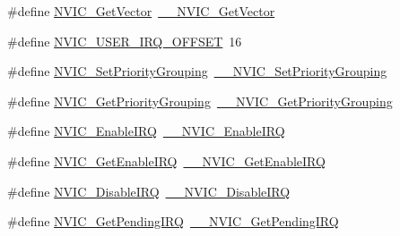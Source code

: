\begin{DoxyCompactItemize}
\item 
\#define \mbox{\hyperlink{group___c_m_s_i_s___core___n_v_i_c_functions_ga955eb1c33a3dcc62af11a8385e8c0fc8}{N\+V\+I\+C\+\_\+\+Get\+Vector}}~\mbox{\hyperlink{group___c_m_s_i_s___core___n_v_i_c_functions_ga44b665d2afb708121d9b10c76ff00ee5}{\+\_\+\+\_\+\+N\+V\+I\+C\+\_\+\+Get\+Vector}}
\item 
\#define \mbox{\hyperlink{group___c_m_s_i_s___core___n_v_i_c_functions_ga8045d905a5ca57437d8e6f71ffcb6df5}{N\+V\+I\+C\+\_\+\+U\+S\+E\+R\+\_\+\+I\+R\+Q\+\_\+\+O\+F\+F\+S\+ET}}~16
\item 
\#define \mbox{\hyperlink{group___c_m_s_i_s___core___n_v_i_c_functions_ga0e798d5aec68cdd8263db86a76df788f}{N\+V\+I\+C\+\_\+\+Set\+Priority\+Grouping}}~\mbox{\hyperlink{group___c_m_s_i_s___core___n_v_i_c_functions_gafc94dcbaee03e4746ade1f5bb9aaa56d}{\+\_\+\+\_\+\+N\+V\+I\+C\+\_\+\+Set\+Priority\+Grouping}}
\item 
\#define \mbox{\hyperlink{group___c_m_s_i_s___core___n_v_i_c_functions_ga4eeb9214f2264fc23c34ad5de2d3fa11}{N\+V\+I\+C\+\_\+\+Get\+Priority\+Grouping}}~\mbox{\hyperlink{group___c_m_s_i_s___core___n_v_i_c_functions_ga9b894af672df4373eb637f8288845c05}{\+\_\+\+\_\+\+N\+V\+I\+C\+\_\+\+Get\+Priority\+Grouping}}
\item 
\#define \mbox{\hyperlink{group___c_m_s_i_s___core___n_v_i_c_functions_ga57b3064413dbc7459d9646020fdd8bef}{N\+V\+I\+C\+\_\+\+Enable\+I\+RQ}}~\mbox{\hyperlink{group___c_m_s_i_s___core___n_v_i_c_functions_ga71227e1376cde11eda03fcb62f1b33ea}{\+\_\+\+\_\+\+N\+V\+I\+C\+\_\+\+Enable\+I\+RQ}}
\item 
\#define \mbox{\hyperlink{group___c_m_s_i_s___core___n_v_i_c_functions_ga857de13232ec65dd15087eaa15bc4a69}{N\+V\+I\+C\+\_\+\+Get\+Enable\+I\+RQ}}~\mbox{\hyperlink{group___c_m_s_i_s___core___n_v_i_c_functions_gaaeb5e7cc0eaad4e2817272e7bf742083}{\+\_\+\+\_\+\+N\+V\+I\+C\+\_\+\+Get\+Enable\+I\+RQ}}
\item 
\#define \mbox{\hyperlink{group___c_m_s_i_s___core___n_v_i_c_functions_ga73b4e251f59cab4e9a5e234aac02ae57}{N\+V\+I\+C\+\_\+\+Disable\+I\+RQ}}~\mbox{\hyperlink{group___c_m_s_i_s___core___n_v_i_c_functions_gae016e4c1986312044ee768806537d52f}{\+\_\+\+\_\+\+N\+V\+I\+C\+\_\+\+Disable\+I\+RQ}}
\item 
\#define \mbox{\hyperlink{group___c_m_s_i_s___core___n_v_i_c_functions_gac608957a239466e9e0cbc30aa64feb3b}{N\+V\+I\+C\+\_\+\+Get\+Pending\+I\+RQ}}~\mbox{\hyperlink{group___c_m_s_i_s___core___n_v_i_c_functions_ga5a92ca5fa801ad7adb92be7257ab9694}{\+\_\+\+\_\+\+N\+V\+I\+C\+\_\+\+Get\+Pending\+I\+RQ}}

\end{DoxyCompactItemize}
